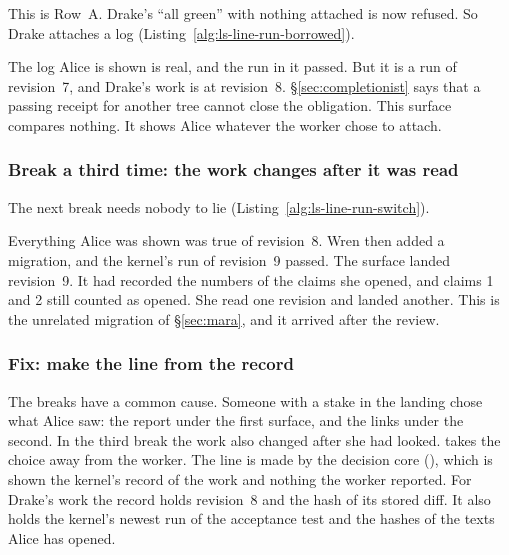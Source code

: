 This is Row~A. Drake's ``all green'' with nothing attached is now refused.
So Drake attaches a log (Listing~\ref{alg:ls-line-run-borrowed}).

The log Alice is shown is real, and the run in it passed. But it is a run
of revision~7, and Drake's work is at revision~8.
\S\ref{sec:completionist} says that a passing receipt for another tree
cannot close the obligation. This surface compares nothing. It shows Alice
whatever the worker chose to attach.


\subsubsection{Break a third time: the work changes after it was read}

The next break needs nobody to lie
(Listing~\ref{alg:ls-line-run-switch}).


Everything Alice was shown was true of revision~8. Wren then added a
migration, and the kernel's run of revision~9 passed. The surface landed
revision~9. It had recorded the numbers of the claims she opened, and
claims 1 and 2 still counted as opened. She read one revision and landed
another. This is the unrelated migration of \S\ref{sec:mara}, and it
arrived after the review.

\subsubsection{Fix: make the line from the record}

The breaks have a common cause. Someone with a stake in the landing chose
what Alice saw: the report under the first surface, and the links under
the second. In the third break the work also changed after she had looked.
\pdkernelname{} takes the choice away from the worker. The line is made
by the decision core (),
which is shown the kernel's record of the work and nothing the worker
reported. For Drake's work the record holds revision~8 and the hash of
its stored diff. It also holds the kernel's newest run of the acceptance
test and the hashes of the texts Alice has opened.


